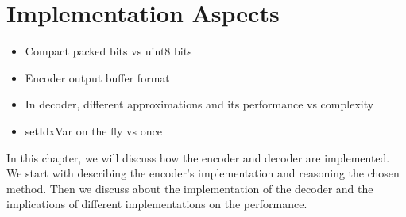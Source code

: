 \chapter{Implementation Aspects}
\begin{itemize}
  \item Compact packed bits vs uint8 bits
  \item Encoder output buffer format
  \item In decoder, different approximations and its performance vs complexity
  \item setIdxVar on the fly vs once
\end{itemize}
In this chapter, we will discuss how the encoder and decoder are implemented. We start with describing the encoder's implementation and reasoning the chosen method. Then we discuss about the implementation of the decoder and the implications of different implementations on the performance.
